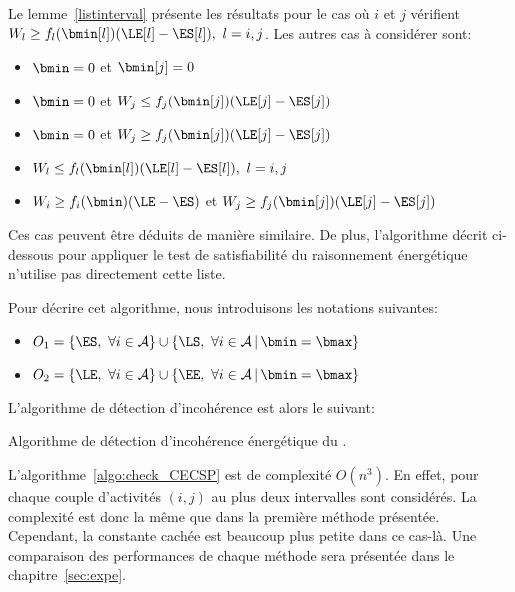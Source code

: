 Le lemme~\ref{listinterval} présente les résultats pour le cas où $i$
et $j$ vérifient $W_l\ge f_l(\bmin[l])(\LE[l]-\ES[l]),\ l=i,j$. Les autres
cas à considérer sont:
\begin{itemize}
\item $\bmin=0$ et $\bmin[j]=0$
\item $\bmin=0$ et $W_j\le f_j(\bmin[j])(\LE[j]-\ES[j])$
\item $\bmin=0$ et $W_j\ge f_j(\bmin[j])(\LE[j]-\ES[j])$
\item $W_l\le f_l(\bmin[l])(\LE[l]-\ES[l]),\ l=i,j$
\item $W_i\ge f_i(\bmin)(\LE-\ES)$ et $W_j\ge
f_j(\bmin[j])(\LE[j]-\ES[j])$
\end{itemize} 
Ces cas peuvent être déduits de manière similaire. De plus,
l'algorithme décrit ci-dessous pour appliquer le test de
satisfiabilité du raisonnement énergétique n'utilise pas directement
cette liste.

Pour décrire cet algorithme, nous introduisons les notations
suivantes: 
\begin{itemize}
\item $O_1=\{\ES ,\ \forall i \in \A\} \cup \{\LS ,\ \forall i \in \A \, |\,
  \bmin = \bmax \} $
\item $O_2=\{\LE ,\ \forall i \in \A\} \cup \{\EE ,\ \forall i \in \A \, |\,
  \bmin = \bmax \}$
\end{itemize}

L'algorithme de détection d'incohérence est alors le suivant:
\begin{algorithm}[!htb]
  \caption{Algorithme de détection d'incohérence énergétique du \CECSP.}
  \label{algo:check_CECSP}
\end{algorithm}

L'algorithme~\ref{algo:check_CECSP} est de complexité 
$O(n^3)$. En effet, pour chaque couple d'activités $(i,j)$ au plus
deux intervalles sont considérés. La complexité est donc la même que
dans la première méthode présentée. Cependant, la constante cachée est
beaucoup plus petite dans ce cas-là. Une comparaison des performances
de chaque méthode sera présentée dans le chapitre~\ref{sec:expe}.

